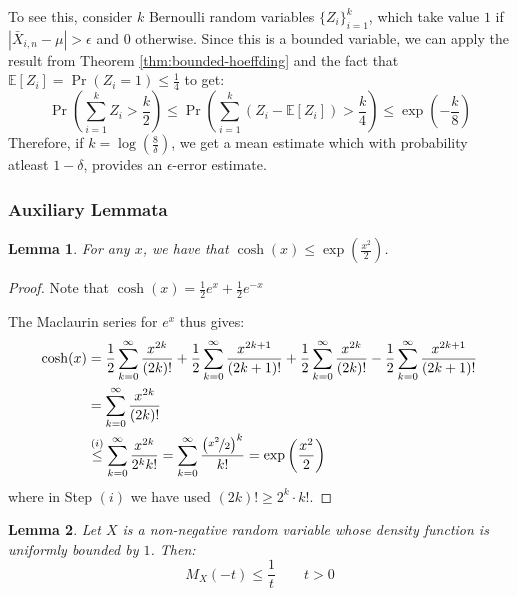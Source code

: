 \documentclass{article}
\newtheorem{lemma}{Lemma}[subsection]
\theoremstyle{remark}
\newcommand{\Exp}{\mathbb{E}}
\begin{document}
To see this, consider \(k\) Bernoulli random variables \(\{Z_{i}\}_{i=1}^{k}\), which take value \(1\) if \(|\bar{X}_{i,n} - \mu| > \epsilon\) and \(0\) otherwise. Since this is a bounded variable, we can apply the result from Theorem \ref{thm:bounded-hoeffding} and the fact that \(\Exp[Z_{i}] = \Pr(Z_{i} = 1) \leq \frac{1}{4}\) to get:
\begin{equation*}
\Pr\left(\sum_{i=1}^{k} Z_{i} > \frac{k}{2}\right) \leq \Pr\left(\sum_{i=1}^{k} (Z_{i} - \Exp[Z_{i}]) > \frac{k}{4}\right) \leq \exp\left(-\frac{k}{8}\right)
\end{equation*}
Therefore, if \(k = \log\left(\frac{8}{\delta}\right)\), we get a mean estimate which with probability atleast \(1 - \delta\), provides an \(\epsilon\)-error estimate.

\subsubsection{Auxiliary Lemmata}
\begin{lemma}
\label{lem:cosh-upper}
For any \(x\), we have that \(\cosh(x) \leq \exp\left(\frac{x^{2}}{2}\right)\).
\end{lemma}

\begin{proof}
Note that \(\cosh(x) = \frac{1}{2}e^{x} + \frac{1}{2}e^{-x}\)

The Maclaurin series for \(e^{x}\) thus gives:
\begin{align*}
\cosh(x) &= \frac{1}{2}\sum_{k=0}^{\infty} \frac{x^{2k}}{(2k)!} + \frac{1}{2}\sum_{k=0}^{\infty} \frac{x^{2k + 1}}{(2k + 1)!} + \frac{1}{2}\sum_{k=0}^{\infty} \frac{x^{2k}}{(2k)!} - \frac{1}{2}\sum_{k=0}^{\infty} \frac{x^{2k + 1}}{(2k + 1)!} \\
&= \sum_{k=0}^{\infty} \frac{x^{2k}}{(2k)!} \\
&\overset{(i)}\leq \sum_{k=0}^{\infty} \frac{x^{2k}}{2^{k}k!} = \sum_{k=0}^{\infty} \frac{\left(\nicefrac{x^{2}}{2}\right)^{k}}{k!} = \exp\left(\frac{x^{2}}{2}\right)
\end{align*}
where in Step \((i)\) we have used \((2k)! \geq 2^{k}\cdot k!\).
\end{proof}

\begin{lemma}
Let \(X\) is a non-negative random variable whose density function is uniformly bounded by \(1\). Then:
\begin{equation*}
M_{X}(-t) \leq \frac{1}{t} \qquad t > 0
\end{equation*}
\end{lemma}
\end{document}
